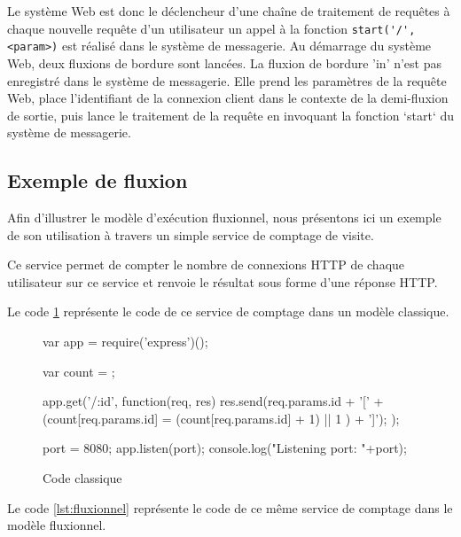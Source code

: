 Le système Web est donc le déclencheur d'une chaîne de traitement de requêtes à chaque nouvelle requête d'un utilisateur un appel à la fonction \lstinline|start('/', <param>)| est réalisé dans le système de messagerie.
Au démarrage du système Web, deux fluxions de bordure sont lancées.
La fluxion de bordure 'in' n'est pas enregistré dans le système de messagerie.
Elle prend les paramètres de la requête Web, place l'identifiant de la connexion client dans le contexte de la demi-fluxion de sortie, puis lance le traitement de la requête en invoquant la fonction `start` du système de messagerie.

\subsection{Exemple de fluxion}

Afin d'illustrer le modèle d'exécution fluxionnel, nous présentons ici un exemple de son utilisation à travers un simple service de comptage de visite.

Ce service permet de compter le nombre de connexions HTTP de chaque utilisateur sur ce service et renvoie le résultat sous forme d'une réponse HTTP.

Le code \ref{lst:classique} représente le code de ce service de comptage dans un modèle classique.

\begin{figure}
  \begin{code}
  var app = require('express')();

  var count = {};

  app.get('/:id', function(req, res){
    res.send(req.params.id + '[' + (count[req.params.id] = (count[req.params.id] + 1) || 1 ) + ']');
  });

  port = 8080;
  app.listen(port);
  console.log("Listening port: "+port);
  \end{code}
  \caption{Code classique}
  \label{lst:classique}
\end{figure}

Le code \ref{lst:fluxionnel} représente le code de ce même service de comptage dans le modèle fluxionnel.

